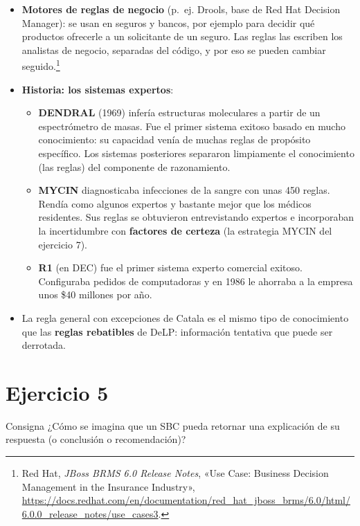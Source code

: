\documentclass[11pt,a4paper]{article}
\newcommand{\fuentesweb}[1]{\footnote{\raggedright #1.}}
\begin{document}
\begin{extras}
\begin{itemize}
  \item \textbf{Motores de reglas de negocio} (p.~ej. Drools, base de Red Hat Decision Manager): se usan en seguros y bancos, por ejemplo para decidir qué productos ofrecerle a un solicitante de un seguro. Las reglas las escriben los analistas de negocio, separadas del código, y por eso se pueden cambiar seguido.\fuentesweb{Red Hat, \textit{JBoss BRMS 6.0 Release Notes}, «Use Case: Business Decision Management in the Insurance Industry», \url{https://docs.redhat.com/en/documentation/red_hat_jboss_brms/6.0/html/6.0.0_release_notes/use_cases3}}
  \item \textbf{Historia: los sistemas expertos}:
  \begin{itemize}
    \item \textbf{DENDRAL} (1969) infería estructuras moleculares a partir de un espectrómetro de masas. Fue el primer sistema exitoso basado en mucho conocimiento: su capacidad venía de muchas reglas de propósito específico. Los sistemas posteriores separaron limpiamente el conocimiento (las reglas) del componente de razonamiento.
    \item \textbf{MYCIN} diagnosticaba infecciones de la sangre con unas 450 reglas. Rendía como algunos expertos y bastante mejor que los médicos residentes. Sus reglas se obtuvieron entrevistando expertos e incorporaban la incertidumbre con \textbf{factores de certeza} (la estrategia MYCIN del ejercicio 7).
    \item \textbf{R1} (en DEC) fue el primer sistema experto comercial exitoso. Configuraba pedidos de computadoras y en 1986 le ahorraba a la empresa unos \$40 millones por año.
  \end{itemize}
  \item La regla general con excepciones de Catala es el mismo tipo de conocimiento que las \textbf{reglas rebatibles} de DeLP: información tentativa que puede ser derrotada.
\end{itemize}
\end{extras}

\section{Ejercicio 5}

\begin{enunciado}{Consigna}
¿Cómo se imagina que un SBC pueda retornar una explicación de su respuesta (o conclusión o recomendación)?
\end{enunciado}
\end{document}
